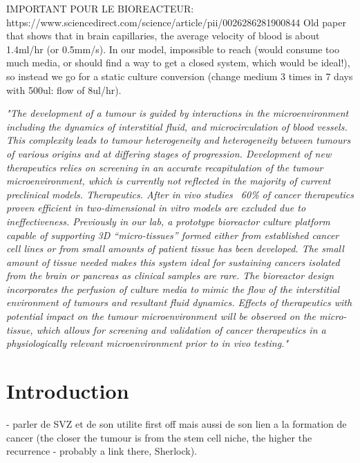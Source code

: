 \documentclass[onecolumn,10pt]{asme2ej}
\begin{document}
	
	\tableofcontents
	\newpage



IMPORTANT POUR LE BIOREACTEUR:
https://www.sciencedirect.com/science/article/pii/0026286281900844
Old paper that shows that in brain capillaries, the average velocity of blood is about 1.4ml/hr (or 0.5mm/s). In our model, impossible to reach (would consume too much media, or should find a way to get a closed system, which would be ideal!), so instead we go for a static culture conversion (change medium 3 times in 7 days with 500ul: flow of 8ul/hr).


\textit{"{\small The development of a tumour is guided by interactions in the microenvironment including the dynamics of interstitial fluid, and microcirculation of blood vessels. This complexity leads to tumour heterogeneity and heterogeneity between tumours of various origins and at differing stages of progression. Development of new therapeutics relies on screening in an accurate recapitulation of the tumour microenvironment, which is currently not reflected in the majority of current preclinical models. Therapeutics. After in vivo studies ~60\% of cancer therapeutics proven efficient in two-dimensional in vitro models are excluded due to ineffectiveness. Previously in our lab, a prototype bioreactor culture platform capable of supporting 3D “micro-tissues” formed either from established cancer cell lines or from small amounts of patient tissue has been developed. The small amount of tissue needed makes this system ideal for sustaining cancers isolated from the brain or pancreas as clinical samples are rare. The bioreactor design incorporates the perfusion of culture media to mimic the flow of the interstitial environment of tumours and resultant fluid dynamics. Effects of therapeutics with potential impact on the tumour microenvironment will be observed on the micro-tissue, which allows for screening and validation of cancer therapeutics in a physiologically relevant microenvironment prior to in vivo testing.}"}


\section{Introduction}

- parler de SVZ et de son utilite first off mais aussi de son lien a la formation de cancer (the closer the tumour is from the stem cell niche, the higher the recurrence - probably a link there, Sherlock).
\end{document}
